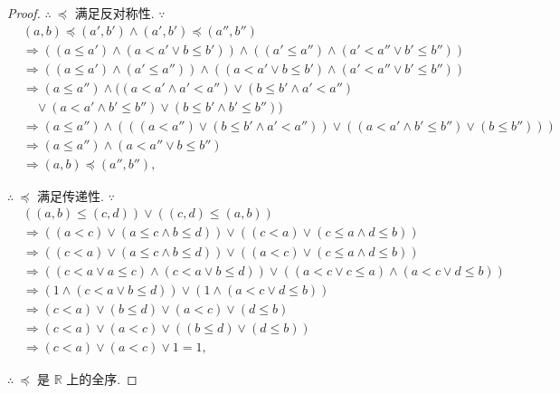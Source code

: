 \documentclass[color=black,device=normal,lang=cn,mode=geye]{elegantnote}
\begin{document}
\begin{proof}
    $\therefore\ \preceq$ 满足反对称性. $\because$
    \begin{align*}
        & (a,b)\preceq(a',b')\wedge(a',b')\preceq(a'',b'') \\
        & \Rightarrow((a\leq a')\wedge(a<a'\vee b\leq b'))\wedge((a'\leq a'')\wedge(a'<a''\vee b'\leq b'')) \\
        & \Rightarrow((a\leq a')\wedge(a'\leq a''))\wedge((a<a'\vee b\leq b')\wedge(a'<a''\vee b'\leq b'')) \\
        & \Rightarrow(a\leq a'')\wedge((a<a'\wedge a'<a'')\vee (b\leq b'\wedge a'<a'') \\
        & \quad\vee(a<a'\wedge b'\leq b'')\vee(b\leq b'\wedge b'\leq b'')) \\
        & \Rightarrow(a\leq a'')\wedge(((a<a'')\vee (b\leq b'\wedge a'<a''))\vee((a<a'\wedge b'\leq b'')\vee(b\leq b''))) \\
        & \Rightarrow(a\leq a'')\wedge(a<a''\vee b\leq b'') \\
        & \Rightarrow(a,b)\preceq(a'',b''),
    \end{align*}

    $\therefore\ \preceq$ 满足传递性. $\because$
    \begin{align*}
        & ((a,b)\leq(c,d))\vee((c,d)\leq(a,b)) \\
        & \Rightarrow((a<c)\vee(a\leq c\wedge b\leq d))\vee((c<a)\vee(c\leq a\wedge d\leq b)) \\
        & \Rightarrow((c<a)\vee(a\leq c\wedge b\leq d))\vee((a<c)\vee(c\leq a\wedge d\leq b)) \\
        & \Rightarrow((c<a\vee a\leq c)\wedge(c<a\vee b\leq d))\vee((a<c\vee c\leq a)\wedge(a<c\vee d\leq b)) \\
        & \Rightarrow(1\wedge(c<a\vee b\leq d))\vee(1\wedge(a<c\vee d\leq b)) \\
        & \Rightarrow(c<a)\vee(b\leq d)\vee(a<c)\vee(d\leq b) \\
        & \Rightarrow(c<a)\vee(a<c)\vee((b\leq d)\vee(d\leq b)) \\
        & \Rightarrow(c<a)\vee(a<c)\vee1=1,
    \end{align*}

    $\therefore\ \preceq$ 是 $\mathbb{R}$ 上的全序.
\end{proof}
\end{document}
